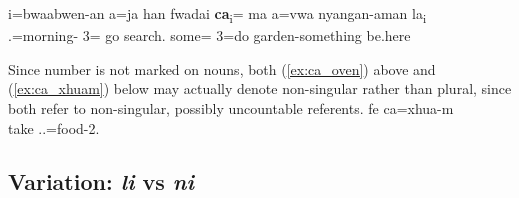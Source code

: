 \ea \label{ex:ca_field}
\gll i=bwaabwen-an a=ja han fwadai \textbf{ca}\textsubscript{i}= {\ob}ma a=vwa nyangan-aman la\textsubscript{i}{\cb}\\
 .=morning-	3= go search. some=  3=do garden-something be.here\\
\glt {}	
\z

Since number is not marked on nouns, both (\ref{ex:ca_oven}) above and (\ref{ex:ca_xhuam}) below may actually denote non-singular rather than plural, since both refer to non-singular, possibly uncountable referents.
\ea \label{ex:ca_xhuam}
\gll		fe   ca=xhua-m 	\\		
		take ..=food-2.\\
\glt		{}
\z
%
%
\subsection{Variation: \textit{li} vs \textit{ni}}
\label{ssec:ni}



%	


